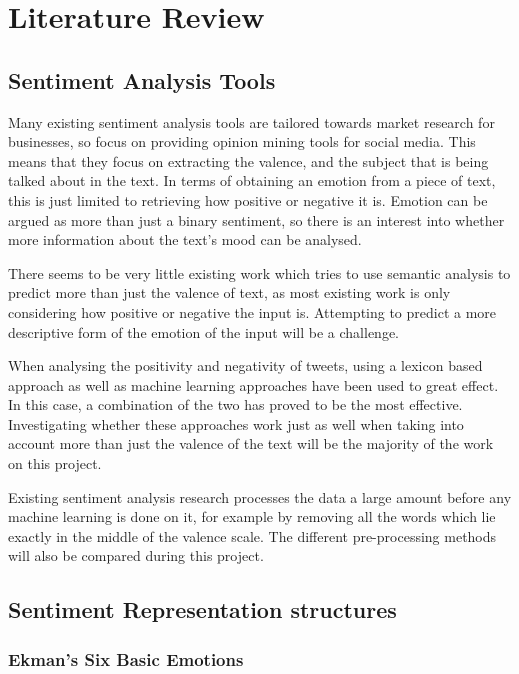 
\section{Literature Review}
\subsection{Sentiment Analysis Tools}


Many existing sentiment analysis tools are tailored towards market research for businesses, so focus on providing opinion mining tools for social media. This means that they focus on extracting the valence, and the subject that is being talked about in the text. In terms of obtaining an emotion from a piece of text, this is just limited to retrieving how positive or negative it is. Emotion can be argued as more than just a binary sentiment, so there is an interest into whether more information about the text's mood can be analysed. 

There seems to be very little existing work which tries to use semantic analysis to predict more than just the valence of text, as most existing work is only considering how positive or negative the input is. Attempting to predict a more descriptive form of the emotion of the input will be a challenge.

When analysing the positivity and negativity of tweets, using a lexicon based approach as well as machine learning approaches have been used \cite{kolchyna2015twitter} to great effect. In this case, a combination of the two has proved to be the most effective. Investigating whether these approaches work just as well when taking into account more than just the valence of the text will be the majority of the work on this project.

Existing sentiment analysis research processes the data a large amount before any machine learning is done on it, for example by removing all the words which lie exactly in the middle of the valence scale.  \cite{kolchyna2015twitter} The different pre-processing methods will also be compared during this project.


\subsection{Sentiment Representation structures}

\subsubsection{Ekman's Six Basic Emotions}

